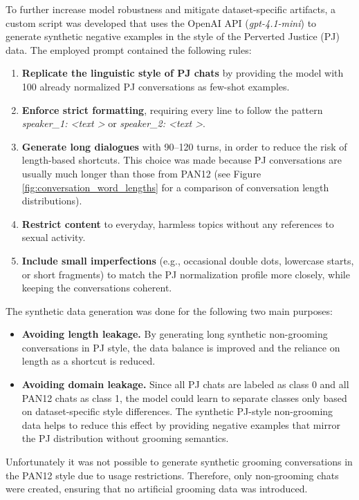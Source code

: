 To further increase model robustness and mitigate dataset-specific artifacts, a custom script was developed that  uses the OpenAI API (\textit{gpt-4.1-mini}) to generate synthetic negative examples in the style of the Perverted Justice (PJ) data. The employed prompt contained the following rules:
\begin{enumerate}
\item \textbf{Replicate the linguistic style of PJ chats} by providing the model with 100 already normalized PJ conversations as few-shot examples.
\item \textbf{Enforce strict formatting}, requiring every line to follow the pattern \textit{speaker\_1: \textless text \textgreater} or \textit{speaker\_2: \textless text \textgreater}.
\item \textbf{Generate long dialogues} with 90–120 turns, in order to reduce the risk of length-based shortcuts. This choice was made because PJ conversations are usually much longer than those from PAN12 (see Figure \ref{fig:conversation_word_lengths} for a comparison of conversation length distributions).
\item \textbf{Restrict content} to everyday, harmless topics without any references to sexual activity.
\item \textbf{Include small imperfections} (e.g., occasional double dots, lowercase starts, or short fragments) to match the PJ normalization profile more closely, while keeping the conversations coherent.
\end{enumerate}

The synthetic data generation was done for the following two main purposes:

\begin{itemize}
    \item \textbf{Avoiding length leakage.} By generating long synthetic non-grooming conversations in PJ style, the data balance is improved and the reliance on length as a shortcut is reduced.
    \item \textbf{Avoiding domain leakage.} Since all PJ chats are labeled as class 0 and all PAN12 chats as class 1, the model could learn to separate classes only based on dataset-specific style differences. The synthetic PJ-style non-grooming data helps to reduce this effect by providing negative examples that mirror the PJ distribution without grooming semantics.
\end{itemize}

Unfortunately it was not possible to generate synthetic grooming conversations in the PAN12 style due to usage restrictions. Therefore, only non-grooming chats were created, ensuring that no artificial grooming data was introduced.


